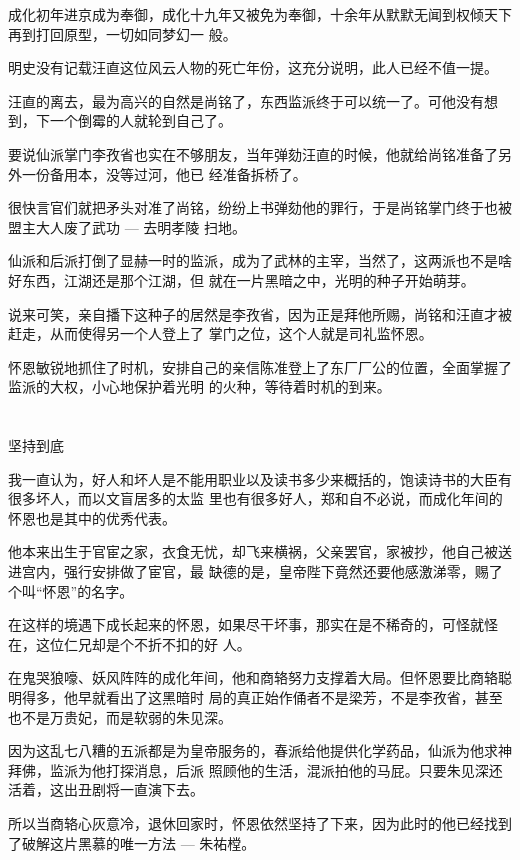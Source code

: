 \documentclass[11pt,a4paper,onecolumn]{article}
\begin{document}
成化初年进京成为奉御，成化十九年又被免为奉御，十余年从默默无闻到权倾天下再到打回原型，一切如同梦幻一
般。

明史没有记载汪直这位风云人物的死亡年份，这充分说明，此人已经不值一提。

汪直的离去，最为高兴的自然是尚铭了，东西监派终于可以统一了。可他没有想到，下一个倒霉的人就轮到自己了。

要说仙派掌门李孜省也实在不够朋友，当年弹劾汪直的时候，他就给尚铭准备了另外一份备用本，没等过河，他已
经准备拆桥了。

很快言官们就把矛头对准了尚铭，纷纷上书弹劾他的罪行，于是尚铭掌门终于也被盟主大人废了武功 --- 去明孝陵
扫地。

仙派和后派打倒了显赫一时的监派，成为了武林的主宰，当然了，这两派也不是啥好东西，江湖还是那个江湖，但
就在一片黑暗之中，光明的种子开始萌芽。

说来可笑，亲自播下这种子的居然是李孜省，因为正是拜他所赐，尚铭和汪直才被赶走，从而使得另一个人登上了
掌门之位，这个人就是司礼监怀恩。

怀恩敏锐地抓住了时机，安排自己的亲信陈准登上了东厂厂公的位置，全面掌握了监派的大权，小心地保护着光明
的火种，等待着时机的到来。

\section[\thesection]{}

坚持到底

我一直认为，好人和坏人是不能用职业以及读书多少来概括的，饱读诗书的大臣有很多坏人，而以文盲居多的太监
里也有很多好人，郑和自不必说，而成化年间的怀恩也是其中的优秀代表。

他本来出生于官宦之家，衣食无忧，却飞来横祸，父亲罢官，家被抄，他自己被送进宫内，强行安排做了宦官，最
缺德的是，皇帝陛下竟然还要他感激涕零，赐了个叫``怀恩''的名字。

在这样的境遇下成长起来的怀恩，如果尽干坏事，那实在是不稀奇的，可怪就怪在，这位仁兄却是个不折不扣的好
人。

在鬼哭狼嚎、妖风阵阵的成化年间，他和商辂努力支撑着大局。但怀恩要比商辂聪明得多，他早就看出了这黑暗时
局的真正始作俑者不是梁芳，不是李孜省，甚至也不是万贵妃，而是软弱的朱见深。

因为这乱七八糟的五派都是为皇帝服务的，春派给他提供化学药品，仙派为他求神拜佛，监派为他打探消息，后派
照顾他的生活，混派拍他的马屁。只要朱见深还活着，这出丑剧将一直演下去。

所以当商辂心灰意冷，退休回家时，怀恩依然坚持了下来，因为此时的他已经找到了破解这片黑慕的唯一方法 ---
朱祐樘。
\end{document}
